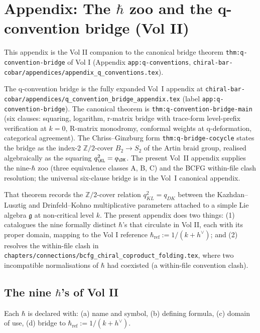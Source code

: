 \chapter{Appendix: The \texorpdfstring{$\hbar$}{hbar} zoo and the q-convention bridge (Vol II)}
\label{app:q-conventions-v2}

This appendix is the Vol II companion to the canonical bridge theorem
\texttt{thm:q-convention-bridge} of Vol I (Appendix \texttt{app:q-conventions},
\texttt{chiral-bar-cobar/appendices/appendix\_q\_conventions.tex}).

\begin{remark}
\label{rem:q-bridge-vol1-canonical-pointer}
The q-convention bridge is the fully expanded Vol~I appendix at
\texttt{chiral-bar-cobar/appendices/q\_convention\_bridge\_appendix.tex}
(label \texttt{app:q-convention-bridge}). The canonical theorem is
\texttt{thm:q-convention-bridge-main} (six clauses: squaring, logarithm, r-matrix
bridge with trace-form level-prefix verification at $k=0$, R-matrix monodromy,
conformal weights at q-deformation, categorical agreement). The Chriss--Ginzburg form
\texttt{thm:q-bridge-cocycle} states the bridge as the index-2
$\mathbb{Z}/2$-cover $B_2 \to S_2$ of the Artin braid group, realised
algebraically as the squaring $q_{\KL}^2 = q_{\DK}$. The present Vol~II
appendix supplies the nine-$\hbar$ zoo (three equivalence classes A, B, C) and
the BCFG within-file clash resolution; the universal six-clause bridge is in the
Vol~I canonical appendix.
\end{remark}
 That theorem
records the $\mathbb{Z}/2$-cover relation $q_{KL}^{2}=q_{DK}$ between the
Kazhdan--Lusztig and Drinfeld--Kohno multiplicative parameters attached to a
simple Lie algebra $\mathfrak{g}$ at non-critical level $k$. The present
appendix does two things: (1) catalogues the nine formally distinct $\hbar$'s
that circulate in Vol II, each with its proper domain, mapping to the Vol I
reference $\hbar_{\mathrm{ref}} := 1/(k+h^\vee)$; and (2) resolves the
within-file clash in
\texttt{chapters/connections/bcfg\_chiral\_coproduct\_folding.tex}, where two
incompatible normalisations of $\hbar$ had coexisted (a within-file convention
clash).

\section{The nine $\hbar$'s of Vol II}
\label{sec:hbar-zoo-vol2}

Each $\hbar$ is declared with: (a) name and symbol, (b) defining formula, (c)
domain of use, (d) bridge to $\hbar_{\mathrm{ref}} := 1/(k+h^\vee)$.

